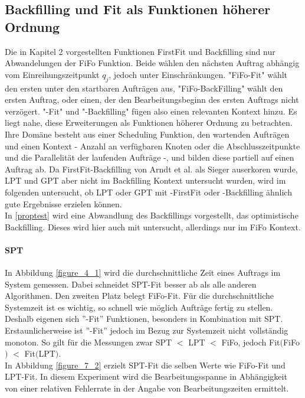 \FloatBarrier
\subsection{Backfilling und Fit als Funktionen höherer Ordnung}
\label{chap:higher-order}

Die in Kapitel 2 vorgestellten Funktionen FirstFit und Backfilling sind nur Abwandelungen der FiFo Funktion. Beide wählen den nächsten Auftrag abhängig vom Einreihungszeitpunkt $q_j$, jedoch unter Einschränkungen. "FiFo-Fit" wählt den ersten unter den startbaren Aufträgen aus, "FiFo-BackFilling" wählt den ersten Auftrag, oder einen, der den Bearbeitungsbeginn des ersten Auftrags nicht verzögert. "-Fit" und "-Backfilling" fügen also einen relevanten Kontext hinzu. Es liegt nahe, diese Erweiterungen als Funktionen höherer Ordnung zu betrachten. Ihre Domäne besteht aus einer Scheduling Funktion, den wartenden Aufträgen und einen Kontext - Anzahl an verfügbaren Knoten oder die Abschlusszeitpunkte und die Parallelität der laufenden Aufträge -, und bilden diese partiell auf einen Auftrag ab. 
Da FirstFit-Backfilling von Arndt et al. als Sieger auserkoren wurde, LPT und GPT aber nicht im Backfilling Kontext untersucht wurden, wird im folgenden untersucht, ob LPT oder GPT mit -FirstFit oder -Backfilling ähnlich gute Ergebnisse erzielen können.\\
In \ref{proptest} wird eine Abwandlung des Backfillings vorgestellt, das optimistische Backfilling. Dieses wird hier auch mit untersucht, allerdings nur im FiFo Kontext.

\paragraph{SPT}
\label{spt-higher-order}
In Abbildung \ref{figure_4_1} wird die durchschnittliche Zeit eines Auftrags im System gemessen. Dabei schneidet SPT-Fit besser ab als alle anderen Algorithmen. Den zweiten Platz belegt FiFo-Fit. Für die durchschnittliche Systemzeit ist es wichtig, so schnell wie möglich Aufträge fertig zu stellen. Deshalb eigenen sich ''-Fit'' Funktionen, besonders in Kombination mit SPT. Erstaunlicherweise ist ''-Fit'' jedoch im Bezug zur Systemzeit nicht vollständig monoton. So gilt für die Messungen zwar SPT $<$ LPT $<$ FiFo, jedoch Fit$($FiFo$)$ $<$ Fit$($LPT$)$.\\
In Abbildung \ref{figure_7_2} erzielt SPT-Fit die selben Werte wie FiFo-Fit und LPT-Fit. In diesem Experiment wird die Bearbeitungsspanne in Abhängigkeit von einer relativen Fehlerrate in der Angabe von Bearbeitungszeiten ermittelt.\\


